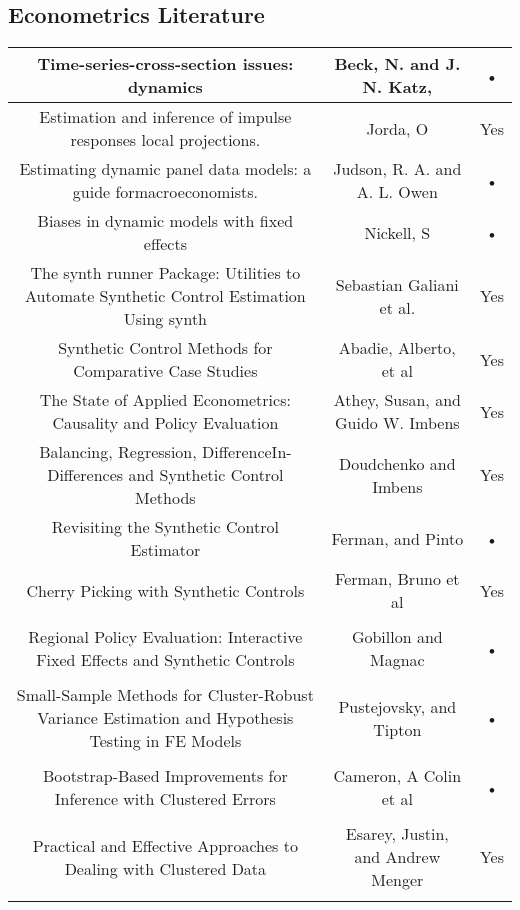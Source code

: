 \documentclass[10pt,a4paper]{article}
\begin{document}
\subsection*{Econometrics Literature}
\begin{tabular}{|c|c|c|}
\hline 
Time-series-cross-section issues: dynamics & Beck, N. and J. N. Katz, & • \\ 
\hline 
Estimation and inference of impulse responses local projections. & Jorda, O & Yes \\ 
\hline 
Estimating dynamic panel data models: a guide formacroeconomists. & Judson, R. A. and A. L. Owen & • \\ 
\hline 
Biases in dynamic models with fixed effects & Nickell, S & • \\ 
\hline 
{\tiny The synth runner Package: Utilities to Automate Synthetic Control Estimation Using synth} & Sebastian Galiani et al. & Yes \\ 
\hline 
Synthetic Control Methods for Comparative Case Studies & Abadie, Alberto, et al & Yes \\ 
\hline 
The State of Applied Econometrics: Causality and Policy Evaluation & Athey, Susan, and Guido W. Imbens & Yes \\ 
\hline 
{\tiny Balancing, Regression, DifferenceIn-Differences and Synthetic Control Methods} & Doudchenko and Imbens & Yes \\ 
\hline
Revisiting the Synthetic Control Estimator & Ferman, and Pinto & • \\ 
\hline 
Cherry Picking with Synthetic Controls & Ferman, Bruno et al & Yes \\ 
\hline \\
{\tiny Regional Policy Evaluation: Interactive Fixed Effects and Synthetic Controls} & Gobillon and Magnac & • \\ 
\hline \\
{\tiny Small-Sample Methods for Cluster-Robust Variance Estimation and Hypothesis Testing in FE Models} & Pustejovsky, and Tipton & • \\ 
\hline \\
{\tiny Bootstrap-Based Improvements for Inference with Clustered Errors} & Cameron, A Colin et al & • \\ 
\hline \\
{\tiny Practical and Effective Approaches to Dealing with Clustered Data} & Esarey, Justin, and Andrew Menger & Yes \\ 
\hline \\

\end{tabular} 
\end{document}
